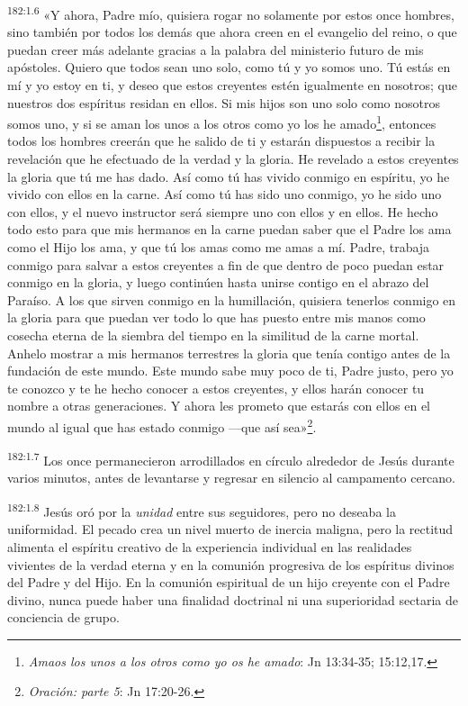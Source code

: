 \par 
\textsuperscript{182:1.6} «Y ahora, Padre mío, quisiera rogar no solamente por estos once hombres, sino también por todos los demás que ahora creen en el evangelio del reino, o que puedan creer más adelante gracias a la palabra del ministerio futuro de mis apóstoles. Quiero que todos sean uno solo, como tú y yo somos uno. Tú estás en mí y yo estoy en ti, y deseo que estos creyentes estén igualmente en nosotros; que nuestros dos espíritus residan en ellos. Si mis hijos son uno solo como nosotros somos uno, y si se aman los unos a los otros como yo los he amado\footnote{\textit{Amaos los unos a los otros como yo os he amado}: Jn 13:34-35; 15:12,17.}, entonces todos los hombres creerán que he salido de ti y estarán dispuestos a recibir la revelación que he efectuado de la verdad y la gloria. He revelado a estos creyentes la gloria que tú me has dado. Así como tú has vivido conmigo en espíritu, yo he vivido con ellos en la carne. Así como tú has sido uno conmigo, yo he sido uno con ellos, y el nuevo instructor será siempre uno con ellos y en ellos. He hecho todo esto para que mis hermanos en la carne puedan saber que el Padre los ama como el Hijo los ama, y que tú los amas como me amas a mí. Padre, trabaja conmigo para salvar a estos creyentes a fin de que dentro de poco puedan estar conmigo en la gloria, y luego continúen hasta unirse contigo en el abrazo del Paraíso. A los que sirven conmigo en la humillación, quisiera tenerlos conmigo en la gloria para que puedan ver todo lo que has puesto entre mis manos como cosecha eterna de la siembra del tiempo en la similitud de la carne mortal. Anhelo mostrar a mis hermanos terrestres la gloria que tenía contigo antes de la fundación de este mundo. Este mundo sabe muy poco de ti, Padre justo, pero yo te conozco y te he hecho conocer a estos creyentes, y ellos harán conocer tu nombre a otras generaciones. Y ahora les prometo que estarás con ellos en el mundo al igual que has estado conmigo ---que así sea»\footnote{\textit{Oración: parte 5}: Jn 17:20-26.}.

\par 
\textsuperscript{182:1.7} Los once permanecieron arrodillados en círculo alrededor de Jesús durante varios minutos, antes de levantarse y regresar en silencio al campamento cercano.

\par 
\textsuperscript{182:1.8} Jesús oró por la \textit{unidad} entre sus seguidores, pero no deseaba la uniformidad. El pecado crea un nivel muerto de inercia maligna, pero la rectitud alimenta el espíritu creativo de la experiencia individual en las realidades vivientes de la verdad eterna y en la comunión progresiva de los espíritus divinos del Padre y del Hijo. En la comunión espiritual de un hijo creyente con el Padre divino, nunca puede haber una finalidad doctrinal ni una superioridad sectaria de conciencia de grupo.

